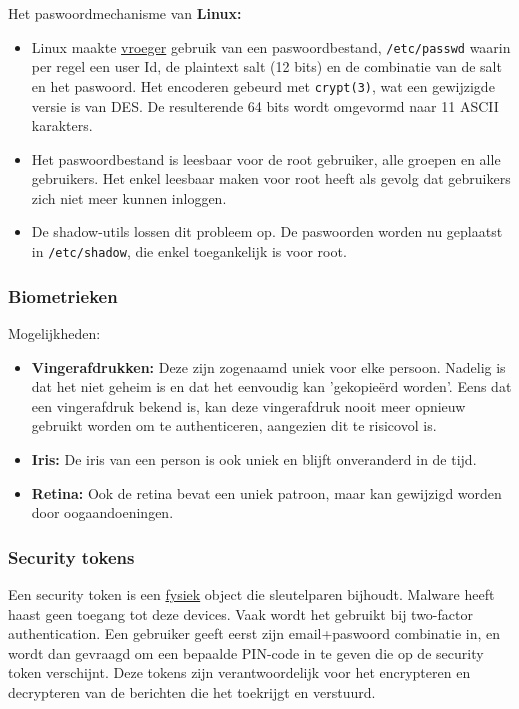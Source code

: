 \documentclass{report}
\begin{document}
	Het paswoordmechanisme van \textbf{Linux:}
	\begin{itemize}
		\item[\info] Linux maakte \underline{vroeger} gebruik van een paswoordbestand, \texttt{/etc/passwd} waarin per regel een user Id, de plaintext salt (12 bits) en de combinatie van de salt en het paswoord. Het encoderen gebeurd met \texttt{crypt(3)}, wat een gewijzigde versie is van DES. De resulterende 64 bits wordt omgevormd naar 11 ASCII karakters. 
		\item[\alert] Het paswoordbestand is leesbaar voor de root gebruiker, alle groepen en alle gebruikers. Het enkel leesbaar maken voor root heeft als gevolg dat gebruikers zich niet meer kunnen inloggen. 
		\item[\info] De shadow-utils lossen dit probleem op. De paswoorden worden nu geplaatst in \texttt{/etc/shadow}, die enkel toegankelijk is voor root.
	\end{itemize}
	\subsubsection{Biometrieken}
	Mogelijkheden:
	\begin{itemize}
		\item[\info] \textbf{Vingerafdrukken:} Deze zijn zogenaamd uniek voor elke persoon. Nadelig is dat het niet geheim is en dat het eenvoudig kan 'gekopieërd worden'. Eens dat een vingerafdruk bekend is, kan deze vingerafdruk nooit meer opnieuw gebruikt worden om te authenticeren, aangezien dit te risicovol is. 
		\item[\info] \textbf{Iris:} De iris van een person is ook uniek en blijft onveranderd in de tijd.
		\item[\info] \textbf{Retina:} Ook de retina bevat een uniek patroon, maar kan gewijzigd worden door oogaandoeningen.
	\end{itemize}
	\subsubsection{Security tokens}
	Een security token is een \underline{fysiek} object die sleutelparen bijhoudt. Malware heeft haast geen toegang tot deze devices. Vaak wordt het gebruikt bij two-factor authentication. Een gebruiker geeft eerst zijn email+paswoord combinatie in, en wordt dan gevraagd om een bepaalde PIN-code in te geven die op de security token verschijnt. Deze tokens zijn verantwoordelijk voor het encrypteren en decrypteren van de berichten die het toekrijgt en verstuurd. 
\end{document}
